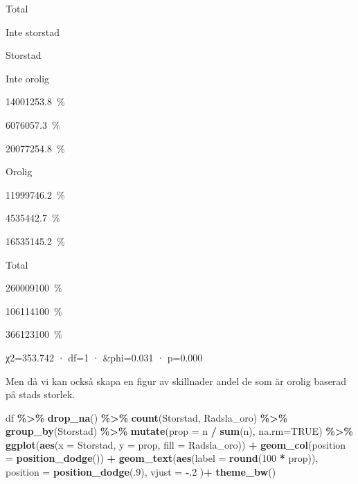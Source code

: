 \documentclass[
]{book}
\newenvironment{Shaded}{\begin{snugshade}}{\end{snugshade}}
\newcommand{\AttributeTok}[1]{\textcolor[rgb]{0.13,0.29,0.53}{#1}}
\newcommand{\ConstantTok}[1]{\textcolor[rgb]{0.56,0.35,0.01}{#1}}
\newcommand{\DecValTok}[1]{\textcolor[rgb]{0.00,0.00,0.81}{#1}}
\newcommand{\FunctionTok}[1]{\textcolor[rgb]{0.13,0.29,0.53}{\textbf{#1}}}
\newcommand{\NormalTok}[1]{#1}
\newcommand{\SpecialCharTok}[1]{\textcolor[rgb]{0.81,0.36,0.00}{\textbf{#1}}}
\begin{document}
Total

Inte storstad

Storstad

Inte orolig

{140012}{53.8~\%}

{60760}{57.3~\%}

{200772}{54.8~\%}

Orolig

{119997}{46.2~\%}

{45354}{42.7~\%}

{165351}{45.2~\%}

Total

{260009}{100~\%}

{106114}{100~\%}

{366123}{100~\%}

χ2=353.742 · df=1 · \&phi=0.031 · p=0.000

Men då vi kan också skapa en figur av skillnader andel de som är orolig baserad på stads storlek.

\begin{Shaded}
\begin{Highlighting}[]
\NormalTok{df }\SpecialCharTok{\%\textgreater{}\%}
  \FunctionTok{drop\_na}\NormalTok{() }\SpecialCharTok{\%\textgreater{}\%} 
  \FunctionTok{count}\NormalTok{(Storstad, Radsla\_oro) }\SpecialCharTok{\%\textgreater{}\%} 
  \FunctionTok{group\_by}\NormalTok{(Storstad) }\SpecialCharTok{\%\textgreater{}\%}
  \FunctionTok{mutate}\NormalTok{(}\AttributeTok{prop =}\NormalTok{ n }\SpecialCharTok{/} \FunctionTok{sum}\NormalTok{(n), }\AttributeTok{na.rm=}\ConstantTok{TRUE}\NormalTok{) }\SpecialCharTok{\%\textgreater{}\%}
  \FunctionTok{ggplot}\NormalTok{(}\FunctionTok{aes}\NormalTok{(}\AttributeTok{x =}\NormalTok{ Storstad, }\AttributeTok{y =}\NormalTok{ prop, }\AttributeTok{fill =}\NormalTok{ Radsla\_oro)) }\SpecialCharTok{+}
  \FunctionTok{geom\_col}\NormalTok{(}\AttributeTok{position =} \FunctionTok{position\_dodge}\NormalTok{()) }\SpecialCharTok{+}
  \FunctionTok{geom\_text}\NormalTok{(}\FunctionTok{aes}\NormalTok{(}\AttributeTok{label =} \FunctionTok{round}\NormalTok{(}\DecValTok{100} \SpecialCharTok{*}\NormalTok{ prop)),}
            \AttributeTok{position =} \FunctionTok{position\_dodge}\NormalTok{(.}\DecValTok{9}\NormalTok{), }\AttributeTok{vjust =} \SpecialCharTok{{-}}\NormalTok{.}\DecValTok{2}
\NormalTok{  )}\SpecialCharTok{+}
  \FunctionTok{theme\_bw}\NormalTok{()}
\end{Highlighting}
\end{Shaded}
\end{document}
